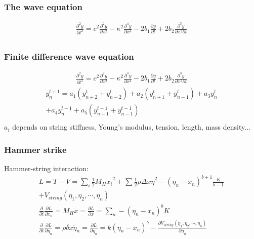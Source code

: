 \documentclass{beamer}
\begin{document}
\begin{frame}\frametitle{The wave equation}
	\begin{gather*}
	\frac{\partial^2 y}{\partial t^2} = c^2\frac{\partial^2 y}{\partial x^2}-\kappa^2\frac{\partial^4y}{\partial x^4}-2b_1\frac{\partial y}{\partial t} + 2b_2 \frac{\partial^3y}{\partial x^2\partial t}\\
\end{gather*}
\end{frame}

\begin{frame}\frametitle{Finite difference wave equation}
	\begin{gather*}
	\frac{\partial^2 y}{\partial t^2} = c^2\frac{\partial^2 y}{\partial x^2}-\kappa^2\frac{\partial^4y}{\partial x^4}-2b_1\frac{\partial y}{\partial t} + 2b_2 \frac{\partial^3y}{\partial x^2\partial t}
	\end{gather*}
	\begin{gather*}
y_n^{t+1} = a_1\left(y_{n+2}^t+y_{n-2}^t\right)+a_2\left(y_{n+1}^t+y_{n-1}^t\right)+a_3y_n^t\\
+a_4y_n^{t-1}+a_5\left(y_{n+1}^{t-1}+y_{n-1}^{t-1}\right)\\
    \end{gather*}
$a_i$ depends on string stiffness, Young's modulus, tension, length, mass density...
\end{frame}


\begin{frame}\frametitle{Hammer strike}
Hammer-string interaction:\\

\begin{gather*}
L = T - V = \sum_i \frac{1}{2}M_H\dot{x_i}^2+\sum\frac{1}{2}\rho \Delta x \dot{\eta}^2-(\eta_n-x_n)^{b+1}\frac{K}{b-1}\\+V_{string}\left(\eta_1,\eta_2,\cdots, \eta_n\right)\\
\frac{\partial}{\partial t}\frac{\partial L}{\partial \dot{x}_n} = M_H\ddot{x} = \frac{\partial L}{\partial x} = \sum_n-\left(\eta_n-x_ n\right)^bK\\
\frac{\partial}{\partial t}\frac{\partial L}{\partial \dot{\eta}_n} = \rho \delta x \ddot{\eta}_n = \frac{\partial L}{\partial \dot{\eta}_n} = k(\eta_n-x_n)^b - \frac{\partial V_{string}\left(\eta_1,\eta_2,\cdots, \eta_n\right)}{\partial \eta_n}
\end{gather*}
\end{frame}
\end{document}
